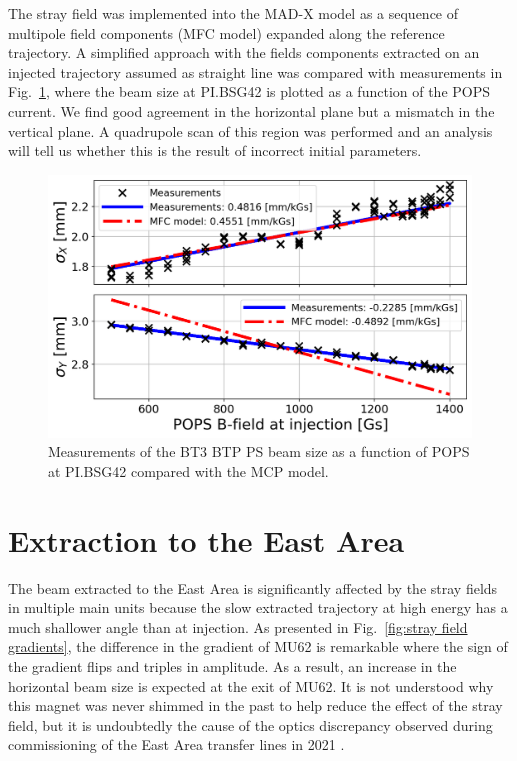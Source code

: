 \documentclass[a4paper,
               biblatex,     %
               keeplastbox,   %
               ]{jacow}
\begin{document}
The stray field was implemented into the MAD-X model as a sequence of multipole field components (MFC model) expanded along the reference trajectory. A simplified approach with the fields components extracted on an injected trajectory assumed as straight line was compared with measurements in Fig.~\ref{fig:injection_btp_beam_size}, where the beam size at PI.BSG42 is plotted as a function of the POPS current. We find good agreement in the horizontal plane but a mismatch in the vertical plane. A quadrupole scan of this region was performed and an analysis will tell us whether this is the result of incorrect initial parameters.

\begin{figure}[!htb]
   \centering
   \includegraphics*[width=1.0\columnwidth]{Beam_size_vs_POPS.png}
   \caption{Measurements of the BT3 BTP PS beam size as a function of POPS at PI.BSG42 compared with the MCP model.}
   \label{fig:injection_btp_beam_size}
\end{figure}

\section{Extraction to the East Area}
The beam extracted to the East Area is significantly affected by the stray fields in multiple main units because the slow extracted trajectory at high energy has a much shallower angle than at injection. As presented in Fig.~\ref{fig:stray field gradients}, the difference in the gradient of MU62 is remarkable where the sign of the gradient flips and triples in amplitude. As a result, an increase in the horizontal beam size is expected at the exit of MU62. It is not understood why this magnet was never shimmed in the past to help reduce the effect of the stray field, but it is undoubtedly the cause of the optics discrepancy observed during commissioning of the East Area transfer lines in 2021 \cite{huschauer:ipac22-mopost006}.
\end{document}
